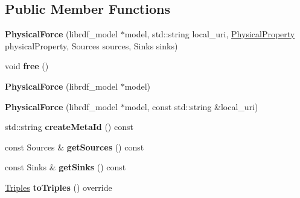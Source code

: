 \subsection*{Public Member Functions}
\begin{DoxyCompactItemize}
\item 
\mbox{\label{classomexmeta_1_1PhysicalForce_a38356903b574ed99cf40df75013d28e7}} 
{\bfseries Physical\+Force} (librdf\+\_\+model $\ast$model, std\+::string local\+\_\+uri, \hyperlink{classomexmeta_1_1PhysicalProperty}{Physical\+Property} physical\+Property, Sources sources, Sinks sinks)
\item 
\mbox{\label{classomexmeta_1_1PhysicalForce_a41cd6c9904f3287bb8cbbab2b9d2ada3}} 
void {\bfseries free} ()
\item 
\mbox{\label{classomexmeta_1_1PhysicalForce_a673e6810fe969bcd087ab88c62e5e041}} 
{\bfseries Physical\+Force} (librdf\+\_\+model $\ast$model)
\item 
\mbox{\label{classomexmeta_1_1PhysicalForce_a4712593524d8acbb7625d6d83e52a527}} 
{\bfseries Physical\+Force} (librdf\+\_\+model $\ast$model, const std\+::string \&local\+\_\+uri)
\item 
\mbox{\label{classomexmeta_1_1PhysicalForce_acbab8e6be67a9b40795e53045b7de4aa}} 
std\+::string {\bfseries create\+Meta\+Id} () const
\item 
\mbox{\label{classomexmeta_1_1PhysicalForce_aa42b8e04573d2ae88f952c76b146d5ac}} 
const Sources \& {\bfseries get\+Sources} () const
\item 
\mbox{\label{classomexmeta_1_1PhysicalForce_ab37bbe3a0f762066fdb43e5c2ce608eb}} 
const Sinks \& {\bfseries get\+Sinks} () const
\item 
\mbox{\label{classomexmeta_1_1PhysicalForce_a39dd511aee85130d07cb6ffb3f8e87f0}} 
\hyperlink{classomexmeta_1_1Triples}{Triples} {\bfseries to\+Triples} () override
\item 
\mbox{\label{classomexmeta_1_1PhysicalForce_a081aecc43d16b2fc8826c4050eb2055d}} 

\end{DoxyCompactItemize}
